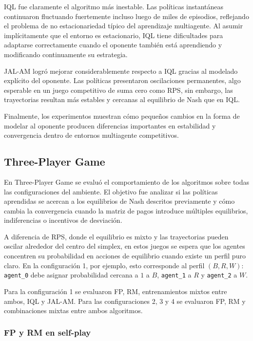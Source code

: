\documentclass[letterpaper,12pt]{article} %
\begin{document}
IQL fue claramente el algoritmo más inestable. Las políticas instantáneas continuaron fluctuando fuertemente incluso luego de miles de episodios, reflejando el problema de no estacionariedad típico del aprendizaje multiagente. Al asumir implícitamente que el entorno es estacionario, IQL tiene dificultades para adaptarse correctamente cuando el oponente también está aprendiendo y modificando continuamente su estrategia.

JAL-AM logró mejorar considerablemente respecto a IQL gracias al modelado explícito del oponente. Las políticas presentaron oscilaciones permanentes, algo esperable en un juego competitivo de suma cero como RPS, sin embargo, las trayectorias resultan más estables y cercanas al equilibrio de Nash que en IQL.

Finalmente, los experimentos muestran cómo pequeños cambios en la forma de modelar al oponente producen diferencias importantes en estabilidad y convergencia dentro de entornos multiagente competitivos.

\subsection{Three-Player Game}

En Three-Player Game se evaluó el comportamiento de los algoritmos sobre todas las configuraciones del ambiente. El objetivo fue analizar si las políticas aprendidas se acercan a los equilibrios de Nash descritos previamente y cómo cambia la convergencia cuando la matriz de pagos introduce múltiples equilibrios, indiferencias o incentivos de desviación.

A diferencia de RPS, donde el equilibrio es mixto y las trayectorias pueden oscilar alrededor del centro del simplex, en estos juegos se espera que los agentes concentren su probabilidad en acciones de equilibrio cuando existe un perfil puro claro. En la configuración 1, por ejemplo, esto corresponde al perfil $(B,R,W)$: \texttt{agent\_0} debe asignar probabilidad cercana a $1$ a $B$, \texttt{agent\_1} a $R$ y \texttt{agent\_2} a $W$.

Para la configuración 1 se evaluaron FP, RM, entrenamientos mixtos entre ambos, IQL y JAL-AM. Para las configuraciones 2, 3 y 4 se evaluaron FP, RM y combinaciones mixtas entre ambos algoritmos.

\subsubsection*{FP y RM en self-play}
\end{document}
